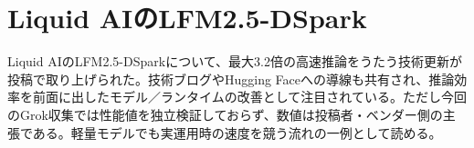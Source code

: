\section{Liquid AIのLFM2.5-DSpark}
Liquid AIのLFM2.5-DSparkについて、最大3.2倍の高速推論をうたう技術更新が投稿で取り上げられた。技術ブログやHugging Faceへの導線も共有され、推論効率を前面に出したモデル／ランタイムの改善として注目されている。ただし今回のGrok収集では性能値を独立検証しておらず、数値は投稿者・ベンダー側の主張である。軽量モデルでも実運用時の速度を競う流れの一例として読める。
